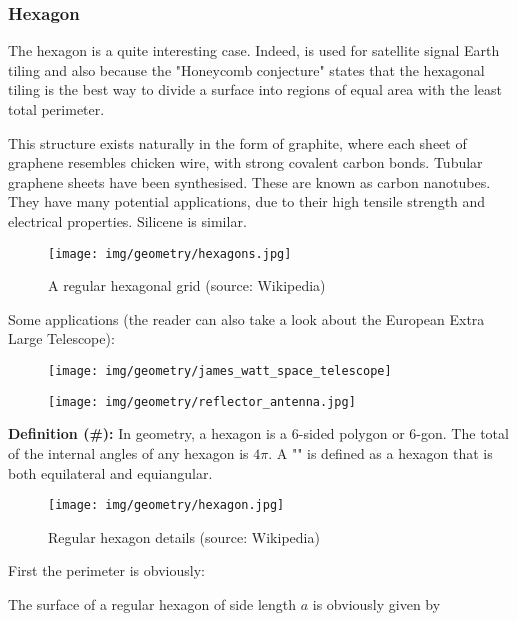 {	\subsubsection{Hexagon}	
	The hexagon is a quite interesting case. Indeed, is used for satellite signal Earth tiling and also because  the "Honeycomb conjecture" states that the hexagonal tiling is the best way to divide a surface into regions of equal area with the least total perimeter. 	
	
	This structure exists naturally in the form of graphite, where each sheet of graphene resembles chicken wire, with strong covalent carbon bonds. Tubular graphene sheets have been synthesised. These are known as carbon nanotubes. They have many potential applications, due to their high tensile strength and electrical properties. Silicene is similar.
	\begin{figure}[H]
		\centering
		\texttt{[image: img/geometry/hexagons.jpg]}
		\caption[A regular hexagonal grid]{A regular hexagonal grid (source: Wikipedia)}
	\end{figure}
	Some applications (the reader can also take a look about the European Extra Large Telescope):
	\begin{figure}[H]
		\centering
		\begin{minipage}{.5\textwidth}
		  \centering
		  \texttt{[image: img/geometry/james\_watt\_space\_telescope]}
		\end{minipage}%
		\begin{minipage}{.5\textwidth}
		  \centering
		  \texttt{[image: img/geometry/reflector\_antenna.jpg]}
		\end{minipage}
	\end{figure}
	
	\textbf{Definition (\#\mydef):} In geometry, a hexagon is a $6$-sided polygon or $6$-gon. The total of the internal angles of any hexagon is $4\pi$. A "" is defined as a hexagon that is both equilateral and equiangular.
	\begin{figure}[H]
		\centering
		\texttt{[image: img/geometry/hexagon.jpg]}
		\caption[Regular hexagon details]{Regular hexagon details (source: Wikipedia)}
	\end{figure}
	First the perimeter is obviously:
	
	The surface of a regular hexagon of side length $a$ is obviously given by
	
}
